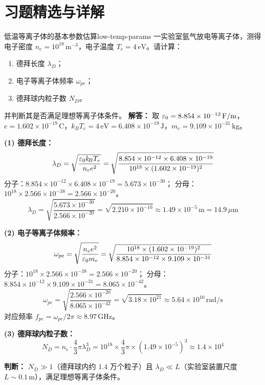 ﻿%

\section*{习题精选与详解}

\begin{example}{低温等离子体的基本参数估算}{low-temp-params}
一实验室氩气放电等离子体，测得电子密度 $n_e = 10^{18}\,\mathrm{m}^{-3}$，电子温度 $T_e = 4\,\mathrm{eV}$。请计算：
\begin{enumerate}[label=(\arabic*)]
\item 德拜长度 $\lambda_D$；
\item 电子等离子体频率 $\omega_{pe}$；
\item 德拜球内粒子数 $N_D$。
\end{enumerate}
并判断其是否满足理想等离子体条件。
\tcblower
\textbf{解答：}
取 $\varepsilon_0 = 8.854\times 10^{-12}\,\mathrm{F/m}$，$e=1.602\times 10^{-19}\,\mathrm{C}$，$k_{\!B}T_e = 4\,\mathrm{eV} = 6.408\times 10^{-19}\,\mathrm{J}$，$m_e = 9.109\times 10^{-31}\,\mathrm{kg}$。

\textbf{(1) 德拜长度：}
\[
\lambda_D = \sqrt{\frac{\varepsilon_0 k_{\!B}T_e}{n_e e^2}} = \sqrt{\frac{8.854\times 10^{-12}\times 6.408\times 10^{-19}}{10^{18}\times (1.602\times 10^{-19})^2}}
\]
分子：$8.854\times 10^{-12}\times 6.408\times 10^{-19} = 5.673\times 10^{-30}$；
分母：$10^{18}\times 2.566\times 10^{-38} = 2.566\times 10^{-20}$。
\[
\lambda_D = \sqrt{\frac{5.673\times 10^{-30}}{2.566\times 10^{-20}}} = \sqrt{2.210\times 10^{-10}} \approx 1.49\times 10^{-5}\,\mathrm{m} = 14.9\,\mu\mathrm{m}
\]

\textbf{(2) 电子等离子体频率：}
\[
\omega_{pe} = \sqrt{\frac{n_e e^2}{\varepsilon_0 m_e}} = \sqrt{\frac{10^{18}\times (1.602\times 10^{-19})^2}{8.854\times 10^{-12}\times 9.109\times 10^{-31}}}
\]
分子：$10^{18}\times 2.566\times 10^{-38} = 2.566\times 10^{-20}$；
分母：$8.854\times 10^{-12}\times 9.109\times 10^{-31} = 8.065\times 10^{-42}$。
\[
\omega_{pe} = \sqrt{\frac{2.566\times 10^{-20}}{8.065\times 10^{-42}}} = \sqrt{3.18\times 10^{21}} \approx 5.64\times 10^{10}\,\mathrm{rad/s}
\]
对应频率 $f_{pe} = \omega_{pe}/2\pi \approx 8.97\,\mathrm{GHz}$。

\textbf{(3) 德拜球内粒子数：}
\[
N_D = n_e \cdot \frac{4}{3}\pi \lambda_D^3 = 10^{18}\times \frac{4}{3}\pi\times(1.49\times 10^{-5})^3 \approx 1.4\times 10^{4}
\]

\textbf{判断：} $N_D\gg 1$（德拜球内约 $1.4$ 万个粒子）且 $\lambda_D\ll L$（实验室装置尺度 $L\sim 0.1\,\mathrm{m}$），满足理想等离子体条件。
\end{example}

